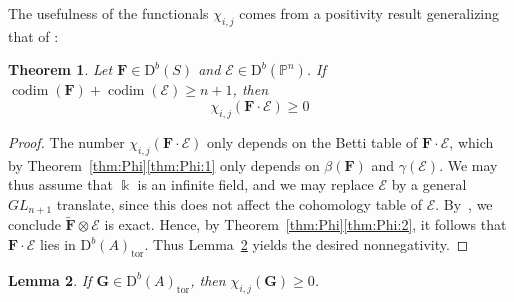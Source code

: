 \documentclass[12pt]{amsart}
\newtheorem{lemma}{Lemma}[section]
\newtheorem{thm}[lemma]{Theorem}
\theoremstyle{definition}
\theoremstyle{remark}
\newcommand{\kk}{\Bbbk}
\newcommand{\codim}{\operatorname{codim}}
\newcommand{\PP}{\mathbb{P}}
\newcommand{\ZZ}{\mathbb{Z}}
\newcommand{\QQ}{\mathbb{Q}}
\newcommand{\VV}{\mathrm{V}}
\newcommand{\cE}{\mathcal{E}}
\newcommand{\FF}{\mathbf{F}}
\newcommand{\Gbull}{\mathbf{G}}
\newcommand{\GL}{{GL}}
\newcommand{\DD}{\mathrm{D}}
\newcommand{\david}[1]{{\color{red} \sf $\clubsuit\clubsuit\clubsuit$ David: [#1]}}
\begin{document}
The usefulness of the functionals $\chi_{i,j}$ comes from a positivity result generalizing that of \cite{eis-schrey1}:

\begin{thm}\label{thm:categorified}\label{thm:categorified:1}  Let $\FF\in \DD^b(S)$ and $\cE\in \DD^b(\PP^n)$. If  $\codim(\FF)+\codim(\cE)\geq n+1$, then
\[
\chi_{i,j}(\FF\cdot \cE)\geq 0
\]
\end{thm}



\begin{proof}
The number $\chi_{i,j}(\FF\cdot \cE)$ only depends on the Betti table of $\FF\cdot \cE$, which by Theorem~\ref{thm:Phi}\eqref{thm:Phi:1} only depends on $\beta(\FF)$ and $\gamma(\cE)$.  We may thus assume that $\kk$ is an infinite field, and we may replace $\cE$ by a general $\GL_{n+1}$ translate, since this does not affect the cohomology table of $\cE$.  By~\cite[Theorem, p.\ 335]{miller-speyer}, we  conclude $\widetilde{\FF}\otimes \cE$ is exact.  Hence, by Theorem~\ref{thm:Phi}\eqref{thm:Phi:2}, it follows that $\FF\cdot \cE$ lies in $\DD^b(A)_{\text{tor}}$.  Thus Lemma~\ref{lem:chi nonneg} yields the desired nonnegativity.
\end{proof}

\begin{lemma}\label{lem:chi nonneg}
If $\Gbull \in \DD^b(A)_{\text{tor}}$, then $\chi_{i,j}(\Gbull)\geq 0$.
\end{lemma}
\end{document}
